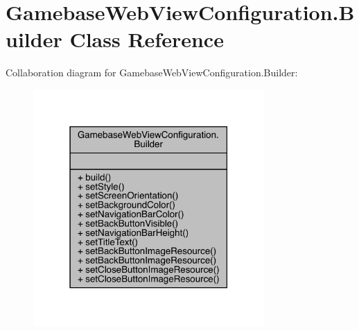\hypertarget{classcom_1_1toast_1_1android_1_1gamebase_1_1_gamebase_web_view_configuration_1_1_builder}{}\section{Gamebase\+Web\+View\+Configuration.\+Builder Class Reference}
\label{classcom_1_1toast_1_1android_1_1gamebase_1_1_gamebase_web_view_configuration_1_1_builder}


Collaboration diagram for Gamebase\+Web\+View\+Configuration.\+Builder\+:\nopagebreak
\begin{figure}[H]
\begin{center}
\leavevmode
\includegraphics[width=250pt]{classcom_1_1toast_1_1android_1_1gamebase_1_1_gamebase_web_view_configuration_1_1_builder__coll__graph}
\end{center}
\end{figure}
